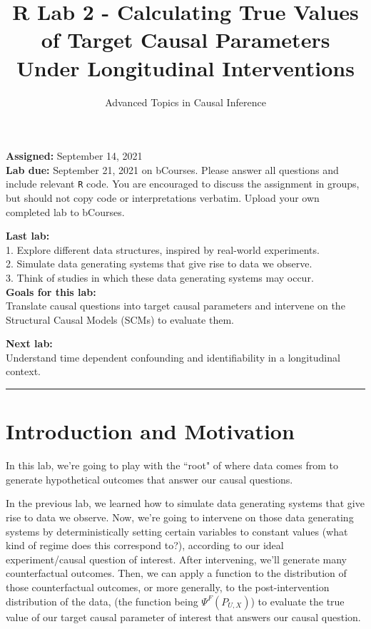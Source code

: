 \documentclass[answers]{exam}
\title{R Lab 2 - Calculating True Values of Target Causal Parameters Under Longitudinal Interventions }
\author{Advanced Topics in Causal Inference}
\date{}
\begin{document}
\maketitle



\noindent \textbf{Assigned:} September 14, 2021\\
\textbf{Lab due:} September 21, 2021 on bCourses. Please answer all questions and include relevant \texttt{R} code. You are encouraged to discuss the assignment in groups, but should not copy code or interpretations verbatim. Upload your own completed lab to bCourses.


\noindent \textbf{Last lab:} \\
1. Explore different data structures, inspired by real-world experiments. \\
2. Simulate data generating systems that give rise to data we observe. \\
3. Think of studies in which these data generating systems may occur. \\


\noindent \textbf{Goals for this lab:} \\
Translate causal questions into target causal parameters and intervene on the Structural Causal Models (SCMs) to evaluate them.


\noindent \textbf{Next lab:}\\
Understand time dependent confounding and identifiability in a longitudinal context.



\begin{center}
\noindent\rule{18cm}{0.4pt}
\end{center}

\section{Introduction and Motivation}

In this lab, we're going to play with the ``root" of where data comes from to generate hypothetical outcomes that answer our causal questions.

\noindent In the previous lab, we learned how to simulate data generating systems that give rise to data we observe. Now, we're going to intervene on those data generating systems by deterministically setting certain variables to constant values (what kind of regime does this correspond to?), according to our ideal experiment/causal question of interest. After intervening, we'll generate many counterfactual outcomes. Then, we can apply a function to the distribution of those counterfactual outcomes, or more generally, to the post-intervention distribution of the data, (the function being $\Psi^F(P_{U,X})$) to evaluate the true value of our target causal parameter of interest that answers our causal question.
\end{document}
